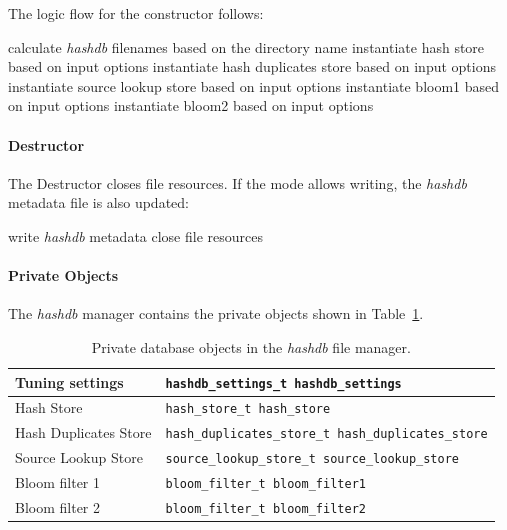 \documentclass[12pt,twoside]{article}
\newcommand{\hdb}{\emph{hashdb}\xspace}
\begin{document}
The logic flow for the constructor follows:
\begin{algorithmic}
\STATE calculate \hdb filenames based on the directory name
\STATE instantiate hash store based on input options
\STATE instantiate hash duplicates store based on input options
\STATE instantiate source lookup store based on input options
  \STATE instantiate bloom1 based on input options
\ENDIF
{}
  \STATE instantiate bloom2 based on input options
\ENDIF
\end{algorithmic}

\paragraph{Destructor}
The Destructor closes file resources.
If the mode allows writing, the \hdb metadata file is also updated:
\begin{algorithmic}
  \STATE write \hdb metadata
\ENDIF
\STATE close file resources
\end{algorithmic}

\paragraph{Private Objects}
The \hdb manager contains the private objects
shown in Table~\ref{hashdb-objects}.
\begin{table}[h]
\center
\begin{tabular}{|p{2in}|p{4in}|}
\hline
Tuning settings & \texttt{hashdb\_settings\_t hashdb\_settings} \\
\hline
Hash Store & \texttt{hash\_store\_t hash\_store} \\
\hline
Hash Duplicates Store & \texttt{hash\_duplicates\_store\_t hash\_duplicates\_store} \\
\hline
Source Lookup Store & \texttt{source\_lookup\_store\_t source\_lookup\_store} \\
\hline
Bloom filter 1 & \texttt{bloom\_filter\_t bloom\_filter1} \\
\hline
Bloom filter 2 & \texttt{bloom\_filter\_t bloom\_filter2} \\
\hline
\end{tabular}
\caption{Private database objects in the \hdb file manager.\label{hashdb-objects}}
\end{table}
\end{document}
